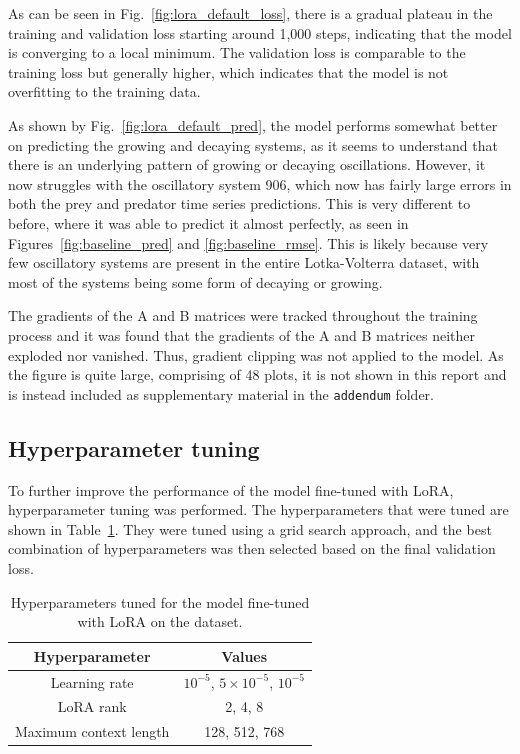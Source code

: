 \documentclass[11pt,a4paper]{article}
\begin{document}
As can be seen in Fig.~\ref{fig:lora_default_loss}, there is a gradual plateau in the training and validation loss starting around 1,000 steps, indicating that the model is converging to a local minimum. The validation loss is comparable to the training loss but generally higher, which indicates that the model is not overfitting to the training data. 

As shown by Fig.~\ref{fig:lora_default_pred}, the model performs somewhat better on predicting the growing and decaying systems, as it seems to understand that there is an underlying pattern of growing or decaying oscillations. However, it now struggles with the oscillatory system 906, which now has fairly large errors in both the prey and predator time series predictions. This is very different to before, where it was able to predict it almost perfectly, as seen in Figures~\ref{fig:baseline_pred} and \ref{fig:baseline_rmse}. This is likely because very few oscillatory systems are present in the entire Lotka-Volterra dataset, with most of the systems being some form of decaying or growing.

The gradients of the A and B matrices were tracked throughout the training process and it was found that the gradients of the A and B matrices neither exploded nor vanished. Thus, gradient clipping was not applied to the model. As the figure is quite large, comprising of 48 plots, it is not shown in this report and is instead included as supplementary material in the \texttt{addendum} folder.

\subsection{Hyperparameter tuning}
To further improve the performance of the model fine-tuned with LoRA, hyperparameter tuning was performed. The hyperparameters that were tuned are shown in Table~\ref{tab:lora_tuning}. They were tuned using a grid search approach, and the best combination of hyperparameters was then selected based on the final validation loss.

\begin{table}
    \centering
    \begin{tabular}{c|c}
        Hyperparameter & Values \\
        \hline
        Learning rate & $10^{-5}$, $5\times10^{-5}$, $10^{-5}$ \\
        LoRA rank & 2, 4, 8 \\
        Maximum context length & 128, 512, 768 \\
    \end{tabular}
    \caption{Hyperparameters tuned for the model fine-tuned with LoRA on the dataset.}
    \label{tab:lora_tuning}
\end{table}
\end{document}
